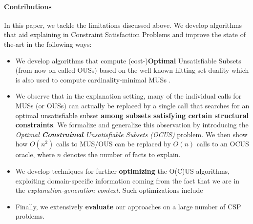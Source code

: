 \documentclass[twoside,11pt]{article}
\newcommand\comment[1]{\marginpar{\tiny #1}}
\renewcommand\comment[1]{#1}
\newcommand{\emilio}[1]{{\comment{\color{red}Emilio: #1}}}
\begin{document}
\paragraph{Contributions} In this paper, we tackle the limitations discussed above.
We develop algorithms that aid explaining in Constraint Satisfaction Problems and improve the state of the-art in the following ways: 

\begin{itemize}
\item We develop algorithms that compute (cost-)\textbf{Optimal} Unsatisfiable Subsets (from now on called OUSs) based on the well-known hitting-set duality which is also used to compute cardinality-minimal MUSs .

\item We observe that in the explanation setting, many of the individual calls for MUSs (or OUSs) can actually be replaced by a single call that searches for an optimal unsatisfiable subset \textbf{among subsets satisfying certain structural constraints}. 
We formalize and generalize this observation by introducing the \emph{Optimal \textbf{Constrained} Unsatisfiable Subsets (OCUS)} problem. We then show how $O(n^2)$ calls to MUS/OUS can be replaced by $O(n)$ calls to an OCUS oracle, where $n$ denotes the number of facts to explain. 

\item We develop techniques for further \textbf{optimizing} the O(C)US algorithms, exploiting domain-specific information coming from the fact that we are in the \emph{explanation-generation context}. Such optimizations include 

\item Finally, we extensively \textbf{evaluate} our approaches on a large number of CSP problems.

\end{itemize}
\end{document}

